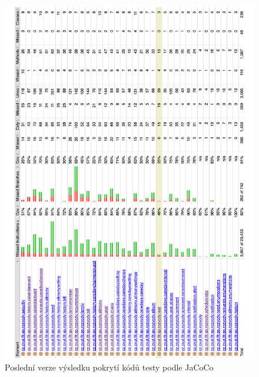     \begin{figure}\centering
	    \includegraphics[width=1.0\textwidth]{pdfs/JaCoCo-results}
	    \caption[Pokrytí kódů testy podle JaCoCo]{Poslední verze výsledku pokrytí kódů testy podle JaCoCo}\label{image:jacoco-results}
    \end{figure}
